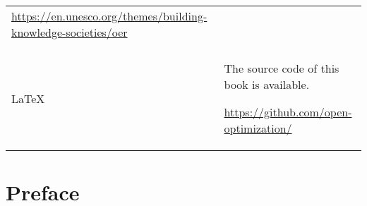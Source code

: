 \documentclass[../main/main.tex]{subfiles}
\begin{document}
\begin{tabular}{p{.3\linewidth}@{\qquad}p{.55\linewidth}}
\begin{minipage}[c]{\linewidth}
    \raggedleft
    \url{https://en.unesco.org/themes/building-knowledge-societies/oer}
  \end{minipage}
  \\\\[2ex]
  \begin{minipage}[c]{\linewidth}
    \centering\LARGE\LaTeX
  \end{minipage}
  & \begin{minipage}[c]{\linewidth}
    The source code of this book is available.\par\vspace{1ex}
    \raggedleft
    \url{https://github.com/open-optimization/}
  \end{minipage}
\end{tabular}

\begin{center}
\end{center}


\newpage

\section*{Preface}


\end{document}
